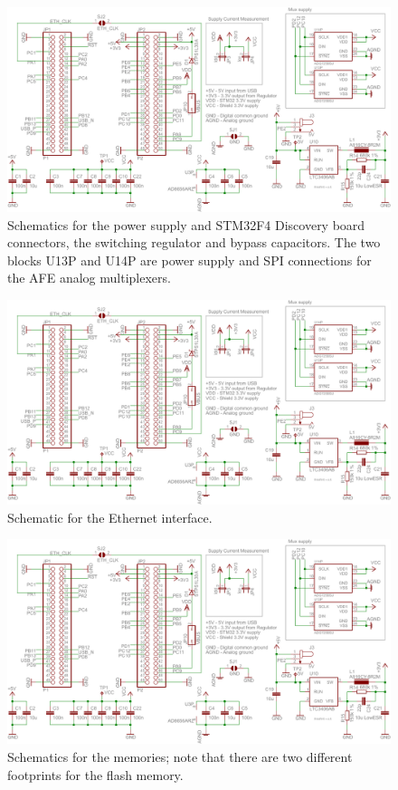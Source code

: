 \begin{figure}[htpb]
  \centering
    \includegraphics[angle=90,page=1]{bilder/schem.pdf}
  \caption{Schematics for the power supply and STM32F4 Discovery board connectors, the switching regulator and bypass
    capacitors. The two blocks U13P and U14P are power supply and SPI connections for the AFE analog multiplexers.}
  \label{fig:schem_power}
\end{figure}

\begin{figure}[htpb]
  \centering
    \includegraphics[angle=90,page=4]{bilder/schem.pdf}
  \caption{Schematic for the Ethernet interface.}
  \label{fig:schem_ethernet}
\end{figure}

\begin{figure}[htpb]
  \centering
    \includegraphics[page=3]{bilder/schem.pdf}
  \caption{Schematics for the memories; note that there are two different footprints for the flash memory.}
  \label{fig:schem_memory}
\end{figure}

